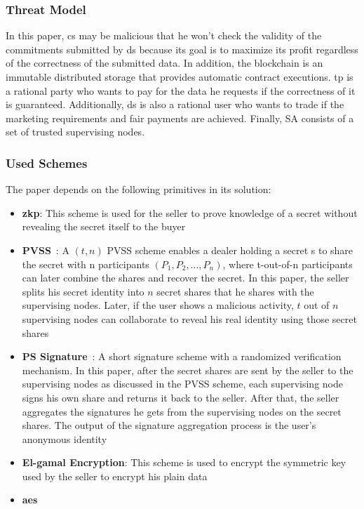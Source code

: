 \subsubsection{Threat Model}

In this paper, \ac{cs} may be malicious that he won't check the validity of the commitments submitted by \ac{ds} because its goal is to maximize its profit regardless of the correctness of the submitted data.
In addition, the blockchain is an immutable distributed storage that provides automatic contract executions.
\ac{tp} is a rational party who wants to pay for the data he requests if the correctness of it is guaranteed.
Additionally, \ac{ds} is also a rational user who wants to trade if the marketing requirements and fair payments are achieved.
Finally, SA consists of a set of trusted supervising nodes.

\subsubsection{Used Schemes}
The paper depends on the following primitives in its solution:

\begin{itemize}
    \item \textbf{\ac{zkp}}: This scheme is used for the seller to prove knowledge of a secret without revealing the secret itself to the buyer
    \item \textbf{PVSS}~\cite{schoenmakers1999simple}: A $(t,n)$ PVSS scheme enables a dealer holding a secret s to share the secret with n participants $(P_1, P_2, ..., P_n)$, where t-out-of-n participants can later combine the shares and recover the secret. In this paper, the seller splits his secret identity into $n$ secret shares that he shares with the supervising nodes. Later, if the user shows a malicious activity, $t$ out of $n$ supervising nodes can collaborate to reveal his real identity using those secret shares
    \item \textbf{PS Signature}~\cite{pointcheval2018reassessing}: A short signature scheme with a randomized verification mechanism. In this paper, after the secret shares are sent by the seller to the supervising nodes as discussed in the PVSS scheme, each supervising node signs his own share and returns it back to the seller. After that, the seller aggregates the signatures he gets from the supervising nodes on the secret shares. The output of the signature aggregation process is the user's anonymous identity
    \item \textbf{El-gamal Encryption}: This scheme is used to encrypt the symmetric key used by the seller to encrypt his plain data
    \item \textbf{\ac{aes}}
\end{itemize}

